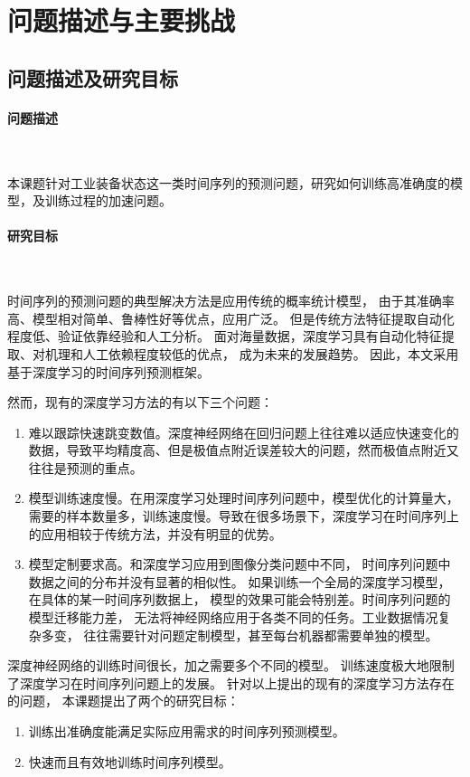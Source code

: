 \section{问题描述与主要挑战}
  \subsection{问题描述及研究目标}
  \paragraph{问题描述}~{}

    本课题针对工业装备状态这一类时间序列的预测问题，研究如何训练高准确度的模型，及训练过程的加速问题。
  \paragraph{研究目标}~{}\label{goal}

    时间序列的预测问题的典型解决方法是应用传统的概率统计模型，
    由于其准确率高、模型相对简单、鲁棒性好等优点，应用广泛。
    但是传统方法特征提取自动化程度低、验证依靠经验和人工分析。
    面对海量数据，深度学习具有自动化特征提取、对机理和人工依赖程度较低的优点，
    成为未来的发展趋势。
    因此，本文采用基于深度学习的时间序列预测框架。

    然而，现有的深度学习方法的有以下三个问题：
    \begin{enumerate}
      \item 难以跟踪快速跳变数值。深度神经网络在回归问题上往往难以适应快速变化的数据，导致平均精度高、但是极值点附近误差较大的问题，然而极值点附近又往往是预测的重点。
      \item 模型训练速度慢。在用深度学习处理时间序列问题中，模型优化的计算量大，需要的样本数量多，训练速度慢。导致在很多场景下，深度学习在时间序列上的应用相较于传统方法，并没有明显的优势。
      \item 模型定制要求高。和深度学习应用到图像分类问题中不同，
      时间序列问题中数据之间的分布并没有显著的相似性。
      如果训练一个全局的深度学习模型，在具体的某一时间序列数据上，
      模型的效果可能会特别差\cite{lebedev2018speeding}。时间序列问题的模型迁移能力差，
      无法将神经网络应用于各类不同的任务。工业数据情况复杂多变，
      往往需要针对问题定制模型，甚至每台机器都需要单独的模型。
    \end{enumerate}

    深度神经网络的训练时间很长，加之需要多个不同的模型。
    训练速度极大地限制了深度学习在时间序列问题上的发展。
    针对以上提出的现有的深度学习方法存在的问题，
    本课题提出了两个的研究目标：
    \begin{enumerate}
      \item 训练出准确度能满足实际应用需求的时间序列预测模型。
      \item 快速而且有效地训练时间序列模型。
    \end{enumerate}


